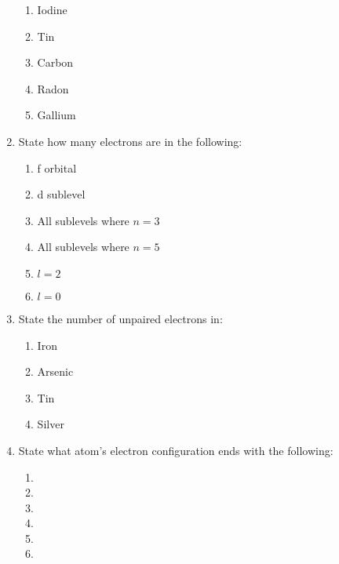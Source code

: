\documentclass[12pt]{article}
\begin{document}
\begin{enumerate}
\begin{enumerate}
      \item Iodine

      \item Tin

      \item Carbon

      \item Radon

      \item Gallium

    \end{enumerate}

  \item State how many electrons are in the following:

    \begin{enumerate}

      \item f orbital

      \item d sublevel

      \item All sublevels where $n=3$

      \item All sublevels where $n=5$

      \item $l=2$

      \item $l=0$

    \end{enumerate}

  \item State the number of unpaired electrons in:

    \begin{enumerate}

      \item Iron

      \item Arsenic

      \item Tin

      \item Silver

    \end{enumerate}

  \item State what atom's electron configuration ends with the following:

    \begin{enumerate}

      \item {}

      \item {}
        
      \item {}

      \item {}

      \item {}

      \item {}

    \end{enumerate}

\end{enumerate}
\end{document}
